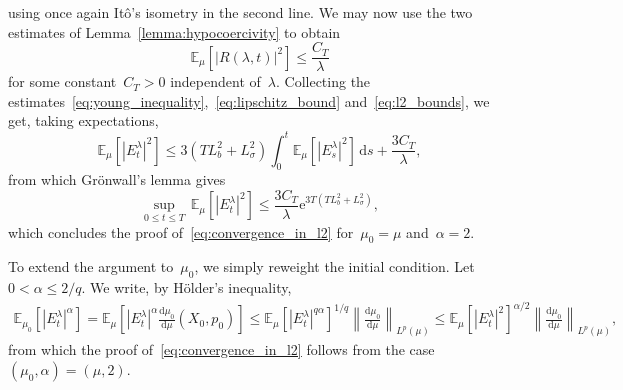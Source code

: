 \documentclass[10pt]{article}
\renewcommand{\d}{\mathrm{d}}
\newcommand{\e}{\mathrm{e}}
\newcommand{\E}{\mathbb{E}}
\newcommand{\1}{\mathbbm 1}
\begin{document}
using once again It\^o's isometry in the second line. We may now use the two estimates of Lemma~\ref{lemma:hypocoercivity} to obtain
\begin{equation}
    \label{eq:l2_bounds}
    \E_\mu\left[\left|R(\lambda,t)\right|^2\right] \leq \frac{C_T}{\lambda}
\end{equation}
for some constant~$C_T>0$ independent of~$\lambda$. Collecting the estimates~\eqref{eq:young_inequality},~\eqref{eq:lipschitz_bound} and~\eqref{eq:l2_bounds}, we get, taking expectations,
\begin{equation}
    \E_\mu\left[|E_t^\lambda|^2\right] \leq 3\left(TL_b^2+L_\sigma^2\right)\int_0^t\E_\mu\left[|E_s^\lambda|^2\right]\,\d s + \frac{3C_T}{\lambda},
\end{equation}
from which Gr\"onwall's lemma gives
\begin{equation}
    \underset{0\leq t\leq T}{\sup}\,\E_\mu\left[|E_t^\lambda|^2\right] \leq \frac{3C_T}{\lambda}\e^{3T(TL_b^2+L_\sigma^2)},
\end{equation}
which concludes the proof of~\eqref{eq:convergence_in_l2} for~$\mu_0=\mu$ and~$\alpha=2$.

To extend the argument to~$\mu_0$, we simply reweight the initial condition. Let~$0<\alpha\leq 2/q$. We write, by H\"older's inequality,
\begin{equation}
    \label{eq:conditioning_argument}
    \begin{aligned}
    \E_{\mu_0}\left[|E_t^\lambda|^\alpha\right] =\E_{\mu}\left[|E_t^\lambda|^\alpha \frac{\d\mu_0}{\d \mu}(X_0,p_0)\right]\leq \E_\mu\left[|E_t^\lambda|^{q\alpha}\right]^{1/q}\left\|\frac{\d \mu_0}{\d \mu}\right\|_{L^p(\mu)}\leq \E_\mu\left[|E_t^\lambda|^2\right]^{\alpha/2}\left\|\frac{\d \mu_0}{\d \mu}\right\|_{L^p(\mu)},
    \end{aligned}
\end{equation}
from which the proof of~\eqref{eq:convergence_in_l2} follows from the case~$(\mu_0,\alpha)=(\mu,2)$.
\end{document}
